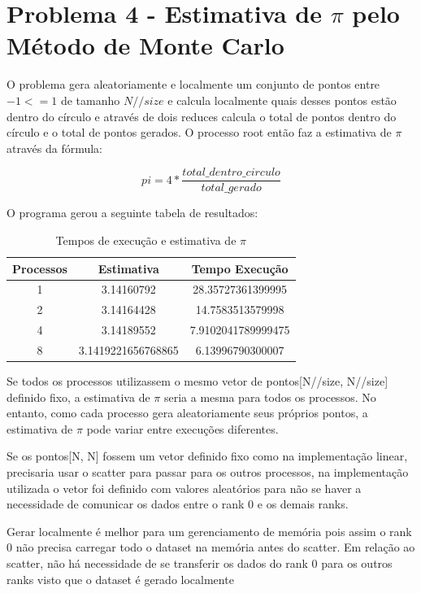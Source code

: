\section{Problema 4 - Estimativa de $\pi$ pelo Método de Monte Carlo}
O problema gera aleatoriamente e localmente um conjunto de pontos entre $-1 <= 1$ de tamanho $N//size$ e calcula localmente quais desses pontos estão dentro do círculo e através de dois reduces calcula o total de pontos dentro do círculo e o total de pontos gerados. O processo root então faz a estimativa de $\pi$ através da fórmula: 

\begin{equation}
  pi = 4*\frac{total\_dentro\_circulo}{total\_gerado}
\end{equation}

O programa gerou a seguinte tabela de resultados:
\begin{table}[H]
\centering
\begin{tabular}{|c|c|c|}
\hline
\textbf{Processos} & \textbf{Estimativa} & \textbf{Tempo Execução} \\ \hline
1 & 3.14160792 & 28.35727361399995 \\ \hline
2 & 3.14164428  & 14.7583513579998\\ \hline
4 & 3.14189552 & 7.9102041789999475 \\ \hline
8 & 3.1419221656768865 & 6.13996790300007 \\ \hline
\end{tabular}
\caption{Tempos de execução e estimativa de $\pi$}
\label{tab:pi}
\end{table}

Se todos os processos utilizassem o mesmo vetor de pontos[N//size, N//size] definido fixo, a estimativa de $\pi$ seria a mesma para todos os processos. No entanto, como cada processo gera aleatoriamente seus próprios pontos, a estimativa de $\pi$ pode variar entre execuções diferentes.

Se os pontos[N, N] fossem um vetor definido fixo como na implementação linear, precisaria usar o scatter para passar para os outros processos, na implementação utilizada o vetor foi definido com valores aleatórios para não se haver a necessidade de comunicar os dados entre o rank 0 e os demais ranks.

Gerar localmente é melhor para um gerenciamento de memória pois assim o rank 0 não precisa carregar todo o dataset na memória antes do scatter. Em relação ao scatter, não há necessidade de se transferir os dados do rank 0 para os outros ranks visto que o dataset é gerado localmente

